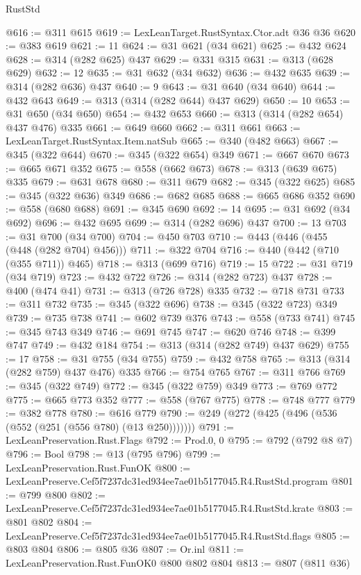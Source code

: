 \begin{lexlean}{RustStd}
\begin{coremodule}
@616 := @311 @615
@619 := LexLeanTarget.RustSyntax.Ctor.adt @36 @36
@620 := @383 @619
@621 := 11
@624 := @31 @621 (@34 @621)
@625 := @432 @624
@628 := @314 (@282 @625) @437
@629 := @331 @315
@631 := @313 (@628 @629)
@632 := 12
@635 := @31 @632 (@34 @632)
@636 := @432 @635
@639 := @314 (@282 @636) @437
@640 := 9
@643 := @31 @640 (@34 @640)
@644 := @432 @643
@649 := @313 (@314 (@282 @644) @437 @629)
@650 := 10
@653 := @31 @650 (@34 @650)
@654 := @432 @653
@660 := @313 (@314 (@282 @654) @437 @476) @335
@661 := @649 @660
@662 := @311 @661
@663 := LexLeanTarget.RustSyntax.Item.natSub
@665 := @340 (@482 @663)
@667 := @345 (@322 @644)
@670 := @345 (@322 @654) @349
@671 := @667 @670
@673 := @665 @671 @352
@675 := @558 (@662 @673)
@678 := @313 (@639 @675) @335
@679 := @631 @678
@680 := @311 @679
@682 := @345 (@322 @625)
@685 := @345 (@322 @636) @349
@686 := @682 @685
@688 := @665 @686 @352
@690 := @558 (@680 @688)
@691 := @345 @690
@692 := 14
@695 := @31 @692 (@34 @692)
@696 := @432 @695
@699 := @314 (@282 @696) @437
@700 := 13
@703 := @31 @700 (@34 @700)
@704 := @450 @703
@710 := @443 (@446 (@455 (@448 (@282 @704) @456)))
@711 := @322 @704
@716 := @440 (@442 (@710 (@355 @711)) @465)
@718 := @313 (@699 @716)
@719 := 15
@722 := @31 @719 (@34 @719)
@723 := @432 @722
@726 := @314 (@282 @723) @437
@728 := @400 (@474 @41)
@731 := @313 (@726 @728) @335
@732 := @718 @731
@733 := @311 @732
@735 := @345 (@322 @696)
@738 := @345 (@322 @723) @349
@739 := @735 @738
@741 := @602 @739 @376
@743 := @558 (@733 @741)
@745 := @345 @743 @349
@746 := @691 @745
@747 := @620 @746
@748 := @399 @747
@749 := @432 @184
@754 := @313 (@314 (@282 @749) @437 @629)
@755 := 17
@758 := @31 @755 (@34 @755)
@759 := @432 @758
@765 := @313 (@314 (@282 @759) @437 @476) @335
@766 := @754 @765
@767 := @311 @766
@769 := @345 (@322 @749)
@772 := @345 (@322 @759) @349
@773 := @769 @772
@775 := @665 @773 @352
@777 := @558 (@767 @775)
@778 := @748 @777
@779 := @382 @778
@780 := @616 @779
@790 := @249 (@272 (@425 (@496 (@536 (@552 (@251 (@556 @780) (@13 @250)))))))
@791 := LexLeanPreservation.Rust.Flags
@792 := Prod.{0, 0}
@795 := @792 (@792 @8 @7)
@796 := Bool
@798 := @13 (@795 @796)
@799 := LexLeanPreservation.Rust.FunOK
@800 := LexLeanPreserve.Cef5f7237dc31ed934ee7ae01b5177045.R4.RustStd.program
@801 := @799 @800
@802 := LexLeanPreserve.Cef5f7237dc31ed934ee7ae01b5177045.R4.RustStd.krate
@803 := @801 @802
@804 := LexLeanPreserve.Cef5f7237dc31ed934ee7ae01b5177045.R4.RustStd.flags
@805 := @803 @804
@806 := @805 @36
@807 := Or.inl
@811 := LexLeanPreservation.Rust.FunOK0 @800 @802 @804
@813 := @807 (@811 @36)

\end{coremodule}
\end{lexlean}
